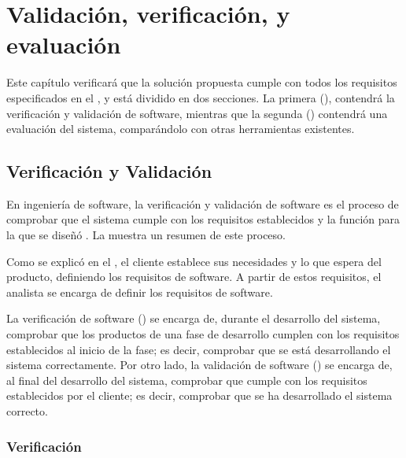 \chapter{Validación, verificación, y evaluación}\label{chap:validation}

Este capítulo verificará que la solución propuesta cumple con todos los
requisitos especificados en el , y está dividido en dos
secciones. La primera (), contendrá la verificación y
validación de software, mientras que la segunda ()
contendrá una evaluación del sistema, comparándolo con otras herramientas
existentes.

\section{Verificación y Validación}\label{sec:tests}

En ingeniería de software, la verificación y validación de software es el
proceso de comprobar que el sistema cumple con los requisitos establecidos y la
función para la que se diseñó \parencite{verification-validation}. La
 muestra un resumen de este proceso.


Como se explicó en el , el cliente establece sus
necesidades y lo que espera del producto, definiendo los requisitos de software.
A partir de estos requisitos, el analista se encarga de definir los requisitos
de software.

La verificación de software () se encarga de,
durante el desarrollo del sistema, comprobar que los productos de una fase de
desarrollo cumplen con los requisitos establecidos al inicio de la fase; es
decir, comprobar que se está desarrollando el sistema correctamente. Por otro
lado, la validación de software () se encarga de, al
final del desarrollo del sistema, comprobar que cumple con los requisitos
establecidos por el cliente; es decir, comprobar que se ha desarrollado el
sistema correcto. \parencite{verification-validation}

\printtesttemplate

\subsection{Verificación}\label{subsec:verification}


